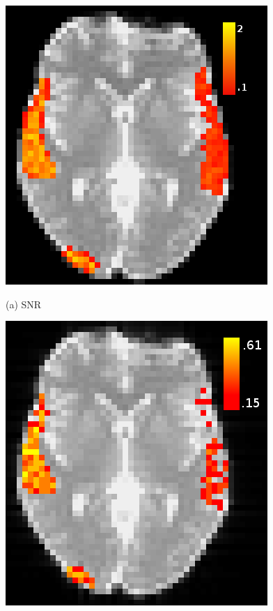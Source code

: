 \documentclass{article}
\begin{document}
\begin{figure}[htb]
\begin{minipage}[b]{.5\linewidth}
  \centering
  \centerline{\includegraphics[width=\textwidth]{snr_hm.png}}
  \centerline{(a) SNR}\medskip
\end{minipage}
\hfill
\begin{minipage}[b]{.49\linewidth}
  \centering
  \centerline{\includegraphics[width=\textwidth]{sim_hm_mi.png}}

\end{minipage}
\end{figure}
\end{document}
